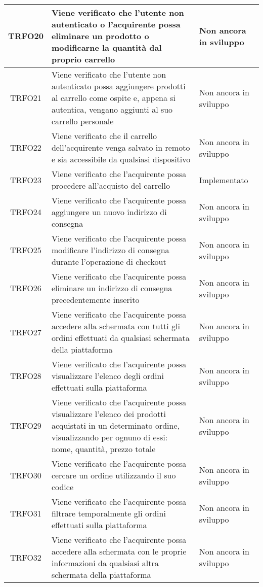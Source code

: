 \begin{longtable}{|c| C{10cm} |C{3cm}|}
    	TRFO20 & Viene verificato che l'utente non autenticato o l'acquirente possa eliminare un prodotto o modificarne la quantità dal proprio carrello & Non ancora in sviluppo\\ \hline
	TRFO21 & Viene verificato che l'utente non autenticato possa aggiungere prodotti al carrello come ospite e, appena si autentica, vengano aggiunti al suo carrello personale & Non ancora in sviluppo\\ \hline
	TRFO22 & Viene verificato che il carrello dell'acquirente venga salvato in remoto e sia accessibile da qualsiasi dispositivo & Non ancora in sviluppo\\ \hline
   	TRFO23 & Viene verificato che l'acquirente possa procedere all'acquisto del carrello & Implementato\\ \hline
   	TRFO24 & Viene verificato che l'acquirente possa aggiungere un nuovo indirizzo di consegna & Non ancora in sviluppo\\ \hline
   	TRFO25 & Viene verificato che l'acquirente possa modificare l'indirizzo di consegna durante l'operazione di checkout & Non ancora in sviluppo\\ \hline
	TRFO26 & Viene verificato che l'acquirente possa eliminare un indirizzo di consegna precedentemente inserito & Non ancora in sviluppo\\ \hline
	TRFO27 & Viene verificato che l'acquirente possa accedere alla schermata con tutti gli ordini effettuati da qualsiasi schermata della piattaforma & Non ancora in sviluppo \\ \hline
	TRFO28 & Viene verificato che l'acquirente possa visualizzare l'elenco degli ordini effettuati sulla piattaforma & Non ancora in sviluppo\\ \hline
	TRFO29 & Viene verificato che l'acquirente possa visualizzare l'elenco dei prodotti acquistati in un determinato ordine, visualizzando per ognuno di essi: nome, quantità, prezzo totale & Non ancora in sviluppo\\ \hline
	TRFO30 & Viene verificato che l'acquirente possa cercare un ordine utilizzando il suo codice & Non ancora in sviluppo\\ \hline
	TRFO31 & Viene verificato che l'acquirente possa filtrare temporalmente gli ordini effettuati sulla piattaforma & Non ancora in sviluppo\\ \hline
	TRFO32 & Viene verificato che l'acquirente possa accedere alla schermata con le proprie informazioni da qualsiasi altra schermata della piattaforma & Non ancora in sviluppo\\ \hline

\end{longtable}

